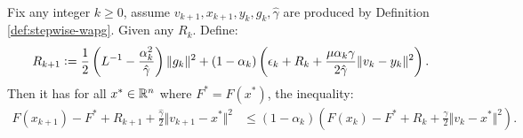 \documentclass[12pt]{article}
\begin{document}
    \begin{proposition}\label{prop:stepwise-lyapunov}\;\\
        Fix any integer $k \ge0$, assume $v_{k + 1}, x_{k + 1}, y_k, g_k, \hat \gamma$ are produced by Definition \ref{def:stepwise-wapg}. 
        Given any $R_k$.
        Define: 
        \begin{align*}
            R_{k + 1}
            \vcentcolon=
            \frac{1}{2}\left(
                L^{-1} - \frac{\alpha_k^2}{\hat \gamma}
            \right)\Vert g_k\Vert^2
            + 
            (1 - \alpha_k)
            \left(
                \epsilon_k + R_k + 
                \frac{\mu\alpha_k\gamma}{2\hat \gamma}
                \Vert v_k - y_k\Vert^2
            \right). 
        \end{align*}
        Then it has for all $x^* \in \mathbb R^n$ where $F^* = F(x^*)$, the inequality: 
        \begin{align*}
            F(x_{k + 1}) - F^* + R_{k + 1} + \frac{\hat \gamma}{2}\Vert v_{k + 1} - x^*\Vert^2
            &\le 
            (1 - \alpha_k)
            \left(
                F(x_k) - F^* + R_k + \frac{\gamma}{2}\Vert v_k - x^*\Vert^2
            \right). 
        \end{align*}
    \end{proposition}
\end{document}
